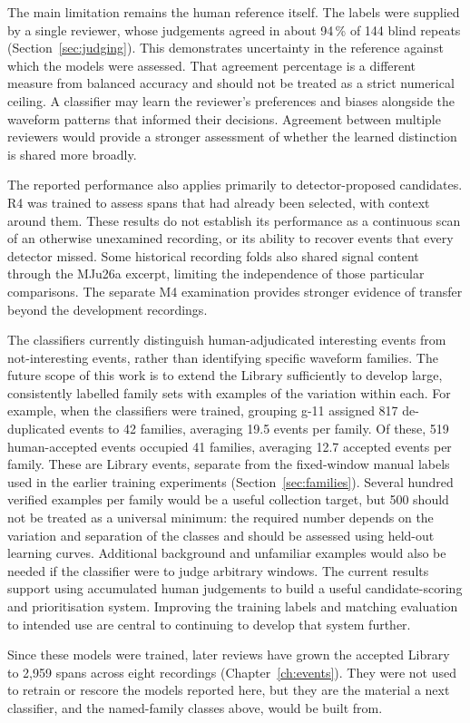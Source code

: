 The main limitation remains the human reference itself. The labels were supplied by a single reviewer, whose judgements agreed in about 94\,\% of 144 blind repeats (Section~\ref{sec:judging}). This demonstrates uncertainty in the reference against which the models were assessed. That agreement percentage is a different measure from balanced accuracy and should not be treated as a strict numerical ceiling. A classifier may learn the reviewer's preferences and biases alongside the waveform patterns that informed their decisions. Agreement between multiple reviewers would provide a stronger assessment of whether the learned distinction is shared more broadly.

The reported performance also applies primarily to detector-proposed candidates. R4 was trained to assess spans that had already been selected, with context around them. These results do not establish its performance as a continuous scan of an otherwise unexamined recording, or its ability to recover events that every detector missed. Some historical recording folds also shared signal content through the MJu26a excerpt, limiting the independence of those particular comparisons. The separate M4 examination provides stronger evidence of transfer beyond the development recordings.

The classifiers currently distinguish human-adjudicated interesting events from not-interesting events, rather than identifying specific waveform families. The future scope of this work is to extend the Library sufficiently to develop large, consistently labelled family sets with examples of the variation within each. For example, when the classifiers were trained, grouping g-11 assigned 817 de-duplicated events to 42 families, averaging 19.5 events per family. Of these, 519 human-accepted events occupied 41 families, averaging 12.7 accepted events per family. These are Library events, separate from the fixed-window manual labels used in the earlier training experiments (Section~\ref{sec:families}). Several hundred verified examples per family would be a useful collection target, but 500 should not be treated as a universal minimum: the required number depends on the variation and separation of the classes and should be assessed using held-out learning curves. Additional background and unfamiliar examples would also be needed if the classifier were to judge arbitrary windows. The current results support using accumulated human judgements to build a useful candidate-scoring and prioritisation system. Improving the training labels and matching evaluation to intended use are central to continuing to develop that system further.


Since these models were trained, later reviews have grown the accepted Library to 2,959 spans across eight recordings (Chapter~\ref{ch:events}). They were not used to retrain or rescore the models reported here, but they are the material a next classifier, and the named-family classes above, would be built from.
